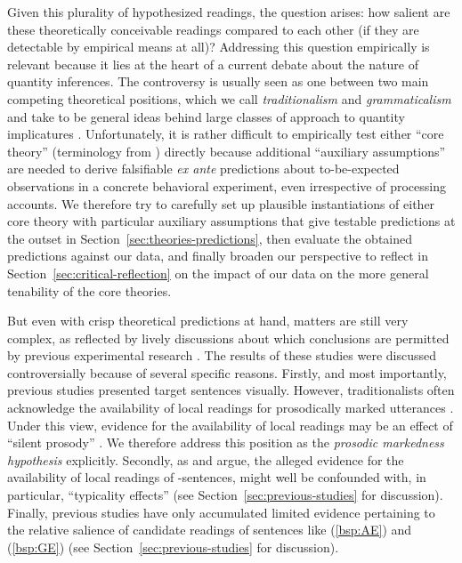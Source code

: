 \documentclass[fleqn,reqno,10pt]{article}
\newcommand{\as}{\acro{as}}
\begin{document}
Given this plurality of hypothesized readings, the question arises:
how salient are these theoretically conceivable readings compared to
each other (if they are detectable by empirical means at all)?
Addressing this question empirically is relevant because it lies at
the heart of a current debate about the nature of quantity inferences.
The controversy is usually seen as one between two main competing
theoretical positions, which we call \emph{traditionalism} and
\emph{grammaticalism} and take to be general ideas behind large
classes of approach to quantity implicatures \citep[c.f.][for related
discussion with a focus on deriving processing
theories]{ChemlaSingh2014:Remarks-on-the-}. Unfortunately, it is
rather difficult to empirically test either ``core theory''
(terminology from \citeauthor{ChemlaSingh2014:Remarks-on-the-})
directly because additional ``auxiliary assumptions'' are needed to
derive falsifiable \emph{ex ante} predictions about to-be-expected
observations in a concrete behavioral experiment, even irrespective of
processing accounts. We therefore try to carefully set up plausible
instantiations of either core theory with particular auxiliary
assumptions that give testable predictions at the outset in
Section~\ref{sec:theories-predictions}, then evaluate the obtained
predictions against our data, and finally broaden our perspective to
reflect in Section~\ref{sec:critical-reflection} on the impact of our
data on the more general tenability of the core theories.

But even with crisp theoretical predictions at hand, matters are still
very complex, as reflected by lively discussions about which
conclusions are permitted by previous experimental research
\citep[e.g.][]{GeurtsPouscoulous2009:Embedded-Implic,CliftonDube2010:Embedded-Implic,ChemlaSpector2010:Experimental-Ev,BenzGotzner2014:Embedded-implic}. The
results of these studies were discussed controversially because of
several specific reasons. Firstly, and most importantly, previous
studies presented target sentences visually.  However, traditionalists
often acknowledge the availability of local readings for prosodically
marked utterances
\citep[e.g.][]{Horn2006:The-Border-Wars,Geurts2009:Scalar-Implicat,ChemlaSpector2010:Experimental-Ev,Geurts2010:Quantity-Implic,Tielvan-Tiel2012:Embedded-Scalar,GeurtsTielvan-Tiel2013:Embedded-Scalar}. Under
this view, evidence for the availability of local readings
\citep[see][]{CliftonDube2010:Embedded-Implic,ChemlaSpector2010:Experimental-Ev}
may be an effect of “silent prosody” \citep[see
e.g.][]{Bader98,Fodor98}. We therefore address this position as the
\emph{prosodic markedness hypothesis} explicitly. Secondly, as
\citet{Tielvan-Tiel2012:Embedded-Scalar} and
\citet{GeurtsTielvan-Tiel2013:Embedded-Scalar} argue, the alleged
evidence for the availability of local readings of \as-sentences,
might well be confounded with, in particular, “typicality effects”
(see Section~\ref{sec:previous-studies} for discussion).  Finally,
previous studies have only accumulated limited evidence pertaining to
the relative salience of candidate readings of sentences like
(\ref{bsp:AE}) and (\ref{bsp:GE}) (see
Section~\ref{sec:previous-studies} for discussion).
\end{document}
